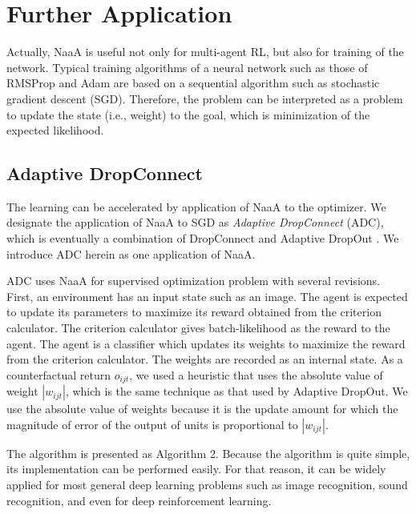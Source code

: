 \section{Further Application}
Actually, NaaA is useful not only for multi-agent RL, but also for training of the network.
Typical training algorithms of a neural network such as those of RMSProp \citep{tieleman2012lecture} and Adam \citep{kingma2014adam} are based on a sequential algorithm such as stochastic gradient descent (SGD).
Therefore, the problem can be interpreted as a problem to update the state (i.e., weight) to the goal, which is minimization of the expected likelihood.

\subsection{Adaptive DropConnect}
The learning can be accelerated by application of NaaA to the optimizer.
We designate the application of NaaA to SGD as {\em Adaptive DropConnect} (ADC), 
which is eventually a combination of DropConnect \citep{wan2013regularization} and Adaptive DropOut \citep{ba2013adaptive}.
We introduce ADC herein as one application of NaaA.

ADC uses NaaA for supervised optimization problem with several revisions.
First, an environment has an input state such as an image. The agent is expected to update its parameters to maximize its reward obtained from the criterion calculator.
The criterion calculator gives batch-likelihood as the reward to the agent.
The agent is a classifier which updates its weights to maximize the reward from the criterion calculator.
The weights are recorded as an internal state.
As a counterfactual return $o_{ijt}$, we used a heuristic that uses the absolute value of weight $|w_{ijt}|$, which is the
same technique as that used by Adaptive DropOut.
We use the absolute value of weights because it is the update amount for which the magnitude of error of the output of units is proportional to $|w_{ijt}|$.

The algorithm is presented as Algorithm 2.
Because the algorithm is quite simple, its implementation can be performed easily.
For that reason, it can be widely applied for most general deep learning problems such as 
image recognition, sound recognition, and even for deep reinforcement learning.

